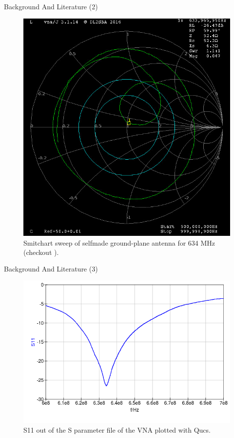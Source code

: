 \documentclass[apectratio=169]{beamer}
\begin{document}
\begin{frame}{Background And Literature (2)}
	\begin{figure}[H]	
		\centering
		\includegraphics[height=0.75\textheight]{./fig/monopole_smith}
		\caption{Smitchart sweep of selfmade ground-plane antenna for 634 MHz (checkout \cite{Pozar}).}
	\end{figure}
\end{frame}

\begin{frame}{Background And Literature (3)}
	\begin{figure}[H]	
		\centering
		\includegraphics[height=0.75\textheight]{./fig/monopole_S11dB}
		\caption{S11 out of the S parameter file of the VNA plotted with Qucs.}
	\end{figure}
\end{frame}
\end{document}
